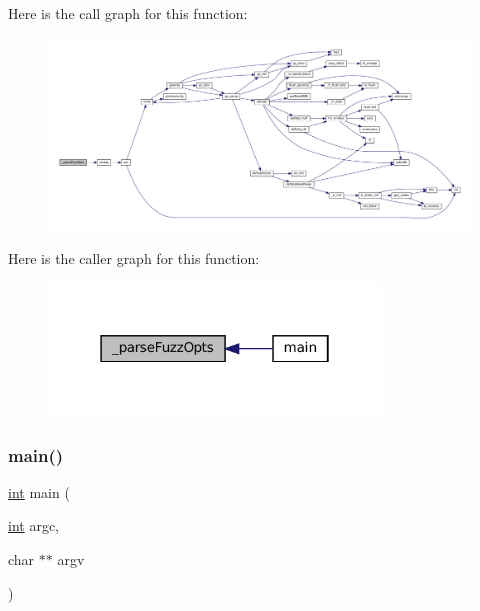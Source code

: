 Here is the call graph for this function\+:
\nopagebreak
\begin{figure}[H]
\begin{center}
\leavevmode
\includegraphics[width=350pt]{fuzz-main_8c_abe6668fd69b615464e23aff05af1b70b_cgraph}
\end{center}
\end{figure}
Here is the caller graph for this function\+:
\nopagebreak
\begin{figure}[H]
\begin{center}
\leavevmode
\includegraphics[width=250pt]{fuzz-main_8c_abe6668fd69b615464e23aff05af1b70b_icgraph}
\end{center}
\end{figure}
\mbox{\label{fuzz-main_8c_a3c04138a5bfe5d72780bb7e82a18e627}} 
\subsubsection{\texorpdfstring{main()}{main()}}
{\footnotesize\ttfamily \mbox{\hyperlink{ioapi_8h_a787fa3cf048117ba7123753c1e74fcd6}{int}} main (\begin{DoxyParamCaption}\item[{\mbox{\hyperlink{ioapi_8h_a787fa3cf048117ba7123753c1e74fcd6}{int}}}]{argc,  }\item[{char $\ast$$\ast$}]{argv }\end{DoxyParamCaption})}

